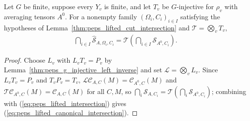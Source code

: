 \begin{lemma}%
    \label{thm:peps_lifted_canonical_intersection}
    \leanok
    Let $G$ be finite, suppose every $Y_v$ is finite, and let $T_v$ be
    $G$-injective for $\rho_v$ with averaging tensors $A^0$. For a nonempty
    family $(\Omega_i,C_i)_{i\in I}$ satisfying the hypotheses of
    Lemma~\ref{thm:peps_lifted_cut_intersection} and
    $\mathcal T=\bigotimes_vT_v$,
    \begin{align}
        \bigcap_{i\in I}\widehat{\mathcal S}_{A,\Omega_i,C_i}
        =\mathcal T\left(\bigcap_{i\in I}\mathcal S_{A^0,C_i}\right).
        \label{eq:peps_lifted_canonical_intersection}
    \end{align}
\end{lemma}
\begin{proof}\leanok
    Choose $L_v$ with $L_vT_v=P_v$ by
    Lemma~\ref{thm:peps_g_injective_left_inverse} and set
    $\mathcal L=\bigotimes_vL_v$. Since $L_vT_v=P_v$ and $T_vP_v=T_v$,
    $\mathcal L\mathcal C_{A,C}(M)=\mathcal C_{A^0,C}(M)$ and
    $\mathcal T\mathcal C_{A^0,C}(M)=\mathcal C_{A,C}(M)$ for all $C,M$, so
    $\bigcap_i\mathcal S_{A,C_i}=\mathcal T(\bigcap_i\mathcal S_{A^0,C_i})$;
    combining with (\ref{eq:peps_lifted_intersection}) gives
    (\ref{eq:peps_lifted_canonical_intersection}).
\end{proof}

